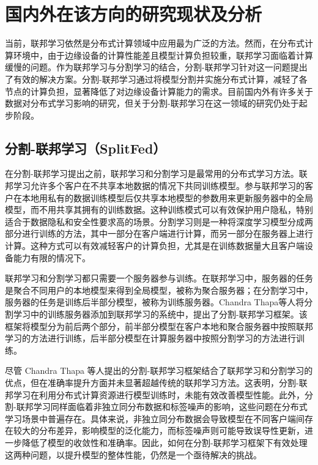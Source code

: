 \chapter{国内外在该方向的研究现状及分析}


当前，联邦学习\cite{konevcny2015federated,mcmahan2017communication}依然是分布式计算领域中应用最为广泛的方法。然而，在分布式计算环境中，由于边缘设备的计算性能差且模型计算负担较重，联邦学习\cite{konevcny2015federated,mcmahan2017communication}面临着计算缓慢的问题。作为联邦学习与分割学习\cite{gupta2018distributed}的结合，分割-联邦学习针对这一问题提出了有效的解决方案。分割-联邦学习通过将模型分割并实施分布式计算，减轻了各节点的计算负担，显著降低了对边缘设备计算能力的需求。目前国内外有许多关于数据对分布式学习影响的研究，但关于分割-联邦学习在这一领域的研究仍处于起步阶段。
\section{分割-联邦学习（SplitFed）}
在分割-联邦学习提出之前，联邦学习\cite{konevcny2015federated,mcmahan2017communication}和分割学习\cite{gupta2018distributed}是最常用的分布式学习方法。联邦学习允许多个客户在不共享本地数据的情况下共同训练模型。参与联邦学习的客户在本地用私有的数据训练模型后仅共享本地模型的参数用来更新服务器中的全局模型，而不用共享其拥有的训练数据。这种训练模式可以有效保护用户隐私，特别适合于数据隐私和安全性要求高的场景。分割学习则是一种将深度学习模型分成两部分进行训练的方法，其中一部分在客户端进行计算，而另一部分在服务器上进行计算。这种方式可以有效减轻客户的计算负担，尤其是在训练数据量大且客户端设备能力有限的情况下。

联邦学习和分割学习都只需要一个服务器参与训练。在联邦学习中，服务器的任务是聚合不同用户的本地模型来得到全局模型，被称为聚合服务器；在分割学习中，服务器的任务是训练后半部分模型，被称为训练服务器。Chandra Thapa等人将分割学习中的训练服务器添加到联邦学习的系统中，提出了分割-联邦学习框架\cite{thapa2022splitfed}。该框架将模型分为前后两个部分，前半部分模型在客户本地和聚合服务器中按照联邦学习的方法进行训练，后半部分模型在计算服务器中按照分割学习的方法进行训练。

尽管 Chandra Thapa 等人提出的分割-联邦学习框架结合了联邦学习和分割学习的优点，但在准确率提升方面并未显著超越传统的联邦学习方法。这表明，分割-联邦学习在利用分布式计算资源进行模型训练时，未能有效改善模型性能。此外，分割-联邦学习同样面临着非独立同分布数据和标签噪声的影响，这些问题在分布式学习场景中普遍存在。具体来说，非独立同分布数据会导致模型在不同客户端间存在较大的分布差异，影响模型的泛化能力，而标签噪声则可能导致误导性更新，进一步降低了模型的收敛性和准确率。因此，如何在分割-联邦学习框架下有效处理这两种问题，以提升模型的整体性能，仍然是一个亟待解决的挑战。
